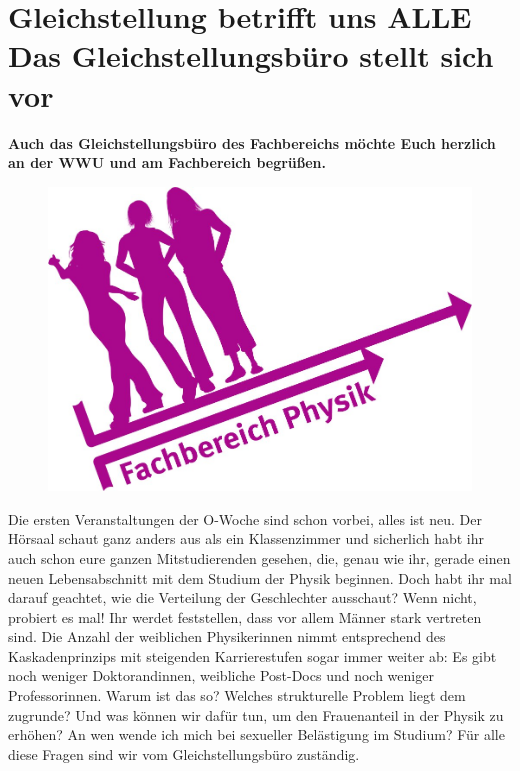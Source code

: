 \section[Gleichstellungsbüro am FB11]{Gleichstellung betrifft uns ALLE\\ Das Gleichstellungsbüro stellt sich vor}

\begin{multicols}{2}

\textbf{Auch das Gleichstellungsbüro des Fachbereichs möchte Euch herzlich an der WWU und am Fachbereich begrüßen.}

\begin{figure}
    \vspace*{-0.3cm}
    \includegraphics[width=\linewidth]{res/gst_buero.jpg}
\end{figure}

Die ersten Veranstaltungen der O-Woche sind schon vorbei, alles ist neu. Der Hörsaal schaut ganz anders aus als ein Klassenzimmer und sicherlich habt ihr auch schon eure ganzen Mitstudierenden gesehen, die, genau wie ihr, gerade einen neuen Lebensabschnitt mit dem Studium der Physik beginnen. Doch habt ihr mal darauf geachtet, wie die Verteilung der Geschlechter ausschaut? Wenn nicht, probiert es mal! Ihr werdet feststellen, dass vor allem Männer stark vertreten sind. Die Anzahl der weiblichen Physikerinnen nimmt entsprechend des Kaskadenprinzips mit steigenden Karrierestufen sogar immer weiter ab: Es gibt noch weniger Doktorandinnen, weibliche Post-Docs und noch weniger Professorinnen. Warum ist das so? Welches strukturelle Problem liegt dem zugrunde? Und was können wir dafür tun, um den Frauenanteil in der Physik zu erhöhen? An wen wende ich mich bei sexueller Belästigung im Studium? Für alle diese Fragen sind wir vom Gleichstellungsbüro zuständig.


\end{multicols}
